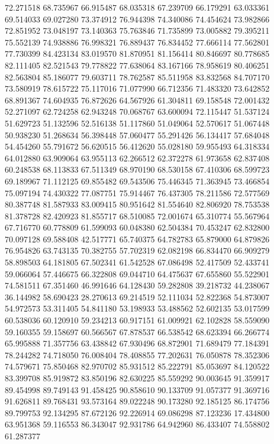72.271518
68.735967
66.915487
68.035318
67.239709
66.179291
63.033361
69.514033
69.027280
73.374912
76.944398
74.340086
74.454624
73.982866
72.851952
73.048197
73.140363
75.763846
71.735899
73.005882
79.395211
75.552139
74.938886
76.998321
76.889437
76.834452
77.666114
77.562801
77.730399
84.423134
83.019570
81.870951
81.156414
80.846697
80.778685
82.111405
82.521543
79.778822
77.638064
83.167166
78.958619
80.406251
82.563804
85.186077
79.603711
78.762587
85.511958
83.832568
84.707170
73.580919
78.615722
75.117016
71.077990
66.712356
71.483320
73.642852
68.891367
74.604935
76.872626
64.567926
61.304811
69.158548
72.001432
52.271097
62.724258
62.943248
70.068767
63.600094
72.115447
51.537124
51.629723
51.132596
52.516138
51.117860
51.049064
52.570617
51.067448
50.938230
51.268634
56.398448
57.060477
55.291426
56.134417
57.684048
54.454260
55.791672
56.620515
56.412620
55.028180
59.955493
64.318334
64.012880
63.909064
63.955113
62.266512
62.372278
61.973658
62.837408
60.248538
68.113833
67.511349
68.970190
68.530158
67.410306
68.599723
69.189967
71.112125
69.855482
69.543506
75.446345
71.363945
73.466854
75.097194
74.430322
77.087751
75.914467
76.437305
78.211586
72.577569
80.387748
81.587933
83.009415
80.951642
81.554640
82.806920
78.753538
81.378728
82.420923
81.855717
68.510085
72.001674
65.310774
55.567964
67.716770
60.778809
61.599093
60.048380
62.504384
70.453247
62.832800
70.097128
69.588408
42.517771
65.740375
64.782783
65.879000
64.879826
76.954826
63.743135
70.382755
57.702319
62.082198
66.834470
66.909279
58.898503
64.181805
67.502341
61.542528
67.086498
52.417509
52.433741
59.066064
57.446675
66.322808
69.044710
64.475637
67.655860
55.522901
74.581511
67.351460
46.991646
64.128430
59.282808
39.218732
44.238067
36.144982
58.690423
28.270613
69.214519
52.111034
52.822368
54.873007
54.972573
53.311405
54.841180
53.198933
53.488562
52.602135
53.017599
60.538036
60.120910
59.234213
60.917151
61.009921
62.102828
58.559090
59.160355
59.158697
60.566567
67.878537
66.538542
68.623394
66.266774
65.995888
71.357756
63.438842
67.930496
68.872901
71.689479
77.184391
78.244282
74.718050
76.008404
78.408855
77.202631
76.050878
78.352306
74.579671
75.850468
82.970702
85.931512
85.222791
85.053697
84.120522
83.399708
85.919872
83.850196
82.630225
85.559292
90.003645
91.359917
89.454998
89.749143
91.458425
90.858610
90.133709
91.057377
91.369716
91.626811
89.768431
93.573164
89.022248
90.173280
92.185125
86.174756
89.799753
92.134295
87.672126
92.226914
69.086298
87.123236
17.434800
63.951368
59.116553
86.343047
92.931786
64.942960
86.433407
74.558802
61.287377

